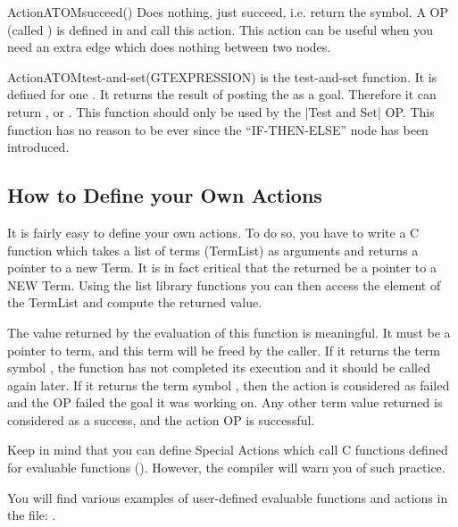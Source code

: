 \begin{typeefa}{Action}{ATOM}{succeed}{()}
Does nothing, just succeed, i.e. return the  symbol. A OP (called
) is defined in  and call this action. This
action can be useful when you need an extra edge which does nothing between two nodes.
\end{typeefa}

\begin{typeefa}{Action}{ATOM}{test-and-set}{(GTEXPRESSION)}
is the test-and-set function. It is defined for one . It
returns the result of posting the  as a goal. Therefore it can
return ,  or . This function should only be
used by the |Test and Set| OP. This function has no reason to be ever since the
``IF-THEN-ELSE'' node has been introduced. 
\end{typeefa}

\subsection{How to Define your Own Actions}

It is fairly easy to define your own actions. To do so, you have to write a C
function which takes a list of terms (TermList) as arguments and returns a
pointer to a new Term. It is in fact critical that the  returned be a
pointer to a NEW Term. Using the list library functions you can then access the
element of the TermList and compute the returned value.

The value returned by the evaluation of this function is meaningful. It must be
a pointer to term, and this term will be freed by the caller. If it returns the
term symbol , the function has not completed its execution and it
should be called again later. If it returns the term symbol , then
the action is considered as failed and the OP failed the goal it was working
on. Any other term value returned is considered as a success, and the action OP
is successful.

Keep in mind that you can define Special Actions which call C functions
defined for evaluable functions ().
However, the compiler will warn you of such practice.

You will find various examples of user-defined evaluable functions and
actions in the file: .

